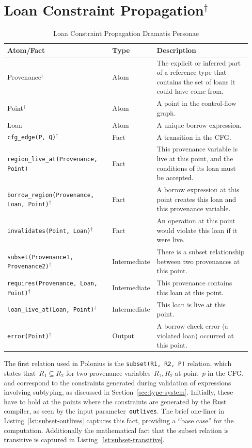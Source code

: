 \documentclass[11pt,a4paper,twoside,openany]{report}
\newcommand{\notmine}[0] {$^\dagger$}
\newcommand{\InDatalog}[1]{\texttt{#1}}
\begin{document}
\section{Loan Constraint Propagation\notmine{}}\label{sec:loan-constr-prop}

{ \renewcommand{\arraystretch}{1.0}
\begin{table}[h]
  \begin{tabular}{@{}l l m{5.5cm}}
    Atom/Fact & Type & Description \\ \hline
    Provenance\notmine & Atom & The explicit or inferred part of a reference type that contains the set of loans it could have come from.  \\
    Point\notmine & Atom & A point in the control-flow graph. \\
    Loan\notmine & Atom & A unique borrow expression. \\
    \InDatalog{cfg_edge(P, Q)}\notmine & Fact & A transition in the CFG. \\
    \InDatalog{region_live_at(Provenance, Point)} & Fact & This provenance variable is live at this point, and the conditions of its loan must be accepted. \\
    \InDatalog{borrow_region(Provenance, Loan, Point)}\notmine & Fact & A borrow expression at this point creates this loan and this provenance variable. \\
    \InDatalog{invalidates(Point, Loan)}\notmine & Fact & An operation at this point would violate this loan if it were live. \\
    \InDatalog{subset(Provenance1, Provenance2)}\notmine & Intermediate & There is a subset relationship between two provenances at this point. \\
    \InDatalog{requires(Provenance, Loan, Point)}\notmine & Intermediate & This provenance contains this loan at this point. \\
    \InDatalog{loan_live_at(Loan, Point)}\notmine & Intermediate & This loan is live at this point. \\
    \InDatalog{error(Point)}\notmine & Output & A borrow check error (a violated loan) occurred at this point. \\
    
  \end{tabular}
\caption{Loan Constraint Propagation Dramatis Personae}
  \label{tab:polonius-facts-recap}
\end{table}%

The first relation used in Polonius is the \InDatalog{subset(R1, R2, P)}
relation, which states that~$R_1 \subseteq R_2$ for two provenance
variables~$R_1, R_2$ at point~$p$ in the CFG, and correspond to the constraints
generated during validation of expressions involving subtyping, as discussed in
Section~\ref{sec:type-system}. Initially, these have to hold at the points where
the constraints are generated by the Rust compiler, as seen by the input
parameter~\InDatalog{outlives}. The brief one-liner in
Listing~\ref{lst:subset-outlives} captures this fact, providing a ``base case''
for the computation. Additionally the mathematical fact that the subset relation
is transitive is captured in Listing~\ref{lst:subset-transitive}.

}
\end{document}
